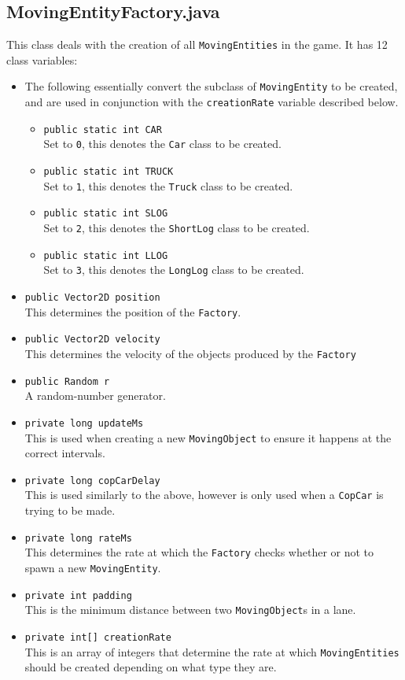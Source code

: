 \documentclass[12pt]{article}
\begin{document}
\subsection{MovingEntityFactory.java}
This class deals with the creation of all \verb|MovingEntities| in the game.
It has 12 class variables:
\begin{itemize}
  \item The following essentially convert the subclass of \verb|MovingEntity| to be created, and are used in conjunction with the \verb|creationRate| variable described below.
    \begin{itemize}
      \item \verb|public static int CAR|\\
            Set to \verb|0|, this denotes the \verb|Car| class to be created.
      \item \verb|public static int TRUCK|\\
            Set to \verb|1|, this denotes the \verb|Truck| class to be created.
      \item \verb|public static int SLOG|\\
            Set to \verb|2|, this denotes the \verb|ShortLog| class to be created.
      \item \verb|public static int LLOG|\\
            Set to \verb|3|, this denotes the \verb|LongLog| class to be created.
    \end{itemize}
  \item \verb|public Vector2D position|\\
        This determines the position of the \verb|Factory|.
  \item \verb|public Vector2D velocity|\\
        This determines the velocity of the objects produced by the \verb|Factory|
  \item \verb|public Random r|\\
        A random-number generator.
  \item \verb|private long updateMs|\\
        This is used when creating a new \verb|MovingObject| to ensure it happens at the correct intervals.
  \item \verb|private long copCarDelay|\\
        This is used similarly to the above, however is only used when a \verb|CopCar| is trying to be made.
  \item \verb|private long rateMs|\\
        This determines the rate at which the \verb|Factory| checks whether or not to spawn a new \verb|MovingEntity|.
  \item \verb|private int padding|\\
        This is the minimum distance between two \verb|MovingObject|s in a lane.
  \item \verb|private int[] creationRate|\\
        This is an array of integers that determine the rate at which \verb|MovingEntities| should be created depending on what type they are.
\end{itemize}
\end{document}
